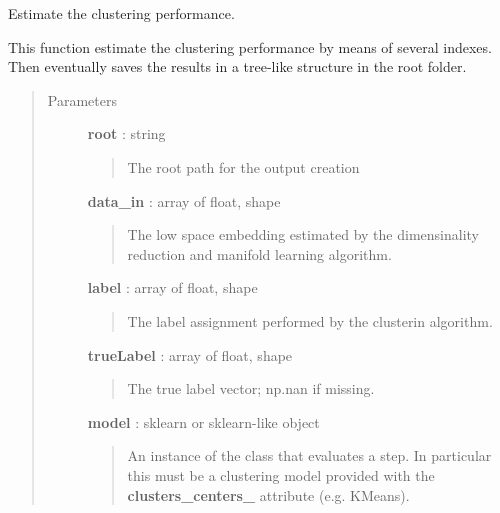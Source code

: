 \documentclass[letterpaper,10pt,english]{sphinxmanual}
\begin{document}

\begin{fulllineitems}
\label{index:adenine.core.analyze_results.est_clst_perf}
Estimate the clustering performance.

This function estimate the clustering performance by means of several indexes. Then eventually saves the results in a tree-like structure in the root folder.
\begin{quote}\begin{description}
\item[{Parameters}] \leavevmode
\textbf{root} : string
\begin{quote}

The root path for the output creation
\end{quote}

\textbf{data\_in} : array of float, shape
\begin{quote}

The low space embedding estimated by the dimensinality reduction and manifold learning algorithm.
\end{quote}

\textbf{label} : array of float, shape
\begin{quote}

The label assignment performed by the clusterin algorithm.
\end{quote}

\textbf{trueLabel} : array of float, shape
\begin{quote}

The true label vector; np.nan if missing.
\end{quote}

\textbf{model} : sklearn or sklearn-like object
\begin{quote}

An instance of the class that evaluates a step. In particular this must be a clustering model provided with the {\color{red}\bfseries{}clusters\_centers\_} attribute (e.g. KMeans).
\end{quote}

\end{description}\end{quote}

\end{fulllineitems}
\end{document}
